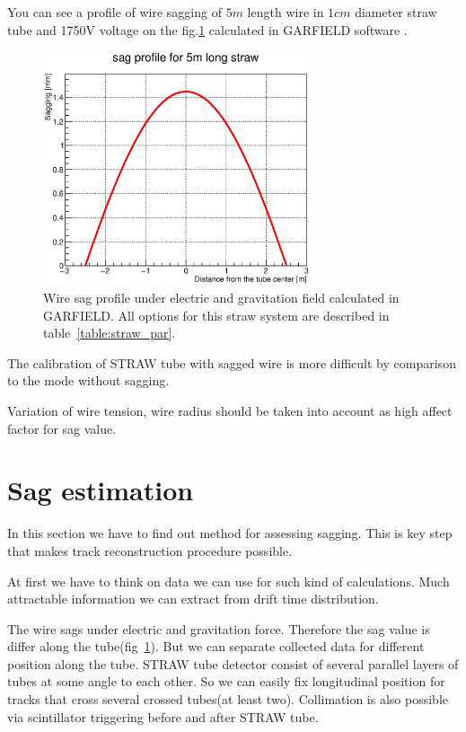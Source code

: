 \documentclass[]{article}
\begin{document}
	You can see a profile of wire sagging of $5m$ length wire in $1cm$ diameter straw tube and 1750V voltage on the fig.\ref{fig:sagProfile} calculated in GARFIELD software \cite{garfield}.
	
	\begin{figure}[h!]
	\centering
	\includegraphics[width=0.7\textwidth]{sagProfileFit.eps}
	\caption{Wire sag profile under electric and gravitation field calculated in GARFIELD. All options for this straw system are described in table~\ref{table:straw_par}.}
	\label{fig:sagProfile}
	\end{figure}	
	
	The calibration of STRAW tube with sagged wire is more difficult by comparison to the mode without sagging. 
	
	Variation of wire tension, wire radius should be taken into account as high affect factor for sag value.
	
	\section{Sag estimation}

	In this section we have to find out method for assessing sagging. This is key step that makes track reconstruction procedure possible.
	
	At first we have to think on data we can use for such kind of calculations. Much attractable information we can extract from drift time distribution. 
	
	The wire sags under electric and gravitation force. Therefore the sag value is differ along the tube(fig~\ref{fig:sagProfile}). But we can separate collected data for different position along the tube. STRAW tube detector consist of several parallel layers of tubes at some angle to each other. So we can easily fix longitudinal position  for tracks that cross several crossed tubes(at least two). Collimation is also possible via scintillator triggering before and after STRAW tube.
	
\end{document}
